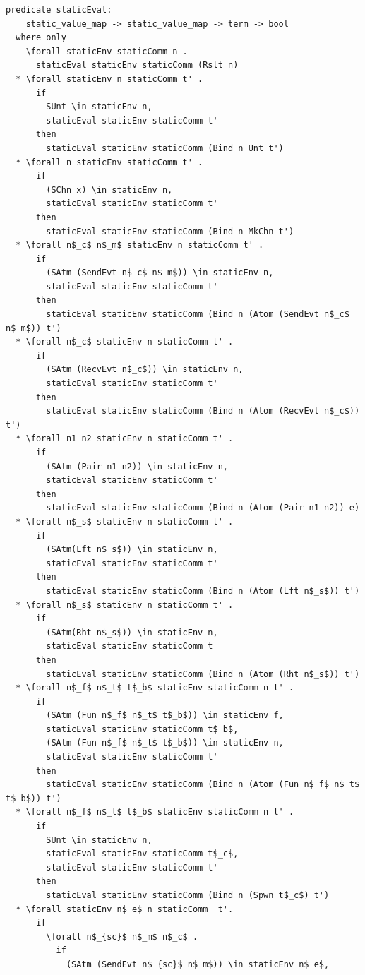 \documentclass[letterpaper, 11pt]{extarticle}
\begin{document}
\begin{lstlisting}[language=logic, mathescape]
  predicate staticEval:
    static_value_map -> static_value_map -> term -> bool
  where only
    \forall staticEnv staticComm n .
      staticEval staticEnv staticComm (Rslt n)
  * \forall staticEnv n staticComm t' .
      if 
        SUnt \in staticEnv n,
        staticEval staticEnv staticComm t'
      then
        staticEval staticEnv staticComm (Bind n Unt t')
  * \forall n staticEnv staticComm t' .
      if 
        (SChn x) \in staticEnv n,
        staticEval staticEnv staticComm t'
      then  
        staticEval staticEnv staticComm (Bind n MkChn t')
  * \forall n$_c$ n$_m$ staticEnv n staticComm t' .
      if
        (SAtm (SendEvt n$_c$ n$_m$)) \in staticEnv n,
        staticEval staticEnv staticComm t' 
      then
        staticEval staticEnv staticComm (Bind n (Atom (SendEvt n$_c$ n$_m$)) t')
  * \forall n$_c$ staticEnv n staticComm t' . 
      if 
        (SAtm (RecvEvt n$_c$)) \in staticEnv n,
        staticEval staticEnv staticComm t'
      then
        staticEval staticEnv staticComm (Bind n (Atom (RecvEvt n$_c$)) t')
  * \forall n1 n2 staticEnv n staticComm t' .
      if
        (SAtm (Pair n1 n2)) \in staticEnv n,
        staticEval staticEnv staticComm t'
      then
        staticEval staticEnv staticComm (Bind n (Atom (Pair n1 n2)) e)
  * \forall n$_s$ staticEnv n staticComm t' .
      if
        (SAtm(Lft n$_s$)) \in staticEnv n,
        staticEval staticEnv staticComm t' 
      then
        staticEval staticEnv staticComm (Bind n (Atom (Lft n$_s$)) t')
  * \forall n$_s$ staticEnv n staticComm t' .
      if
        (SAtm(Rht n$_s$)) \in staticEnv n, 
        staticEval staticEnv staticComm t
      then
        staticEval staticEnv staticComm (Bind n (Atom (Rht n$_s$)) t')
  * \forall n$_f$ n$_t$ t$_b$ staticEnv staticComm n t' .
      if
        (SAtm (Fun n$_f$ n$_t$ t$_b$)) \in staticEnv f, 
        staticEval staticEnv staticComm t$_b$, 
        (SAtm (Fun n$_f$ n$_t$ t$_b$)) \in staticEnv n, 
        staticEval staticEnv staticComm t'
      then
        staticEval staticEnv staticComm (Bind n (Atom (Fun n$_f$ n$_t$ t$_b$)) t')
  * \forall n$_f$ n$_t$ t$_b$ staticEnv staticComm n t' .
      if
        SUnt \in staticEnv n, 
        staticEval staticEnv staticComm t$_c$, 
        staticEval staticEnv staticComm t'
      then
        staticEval staticEnv staticComm (Bind n (Spwn t$_c$) t')
  * \forall staticEnv n$_e$ n staticComm  t'.
      if
        \forall n$_{sc}$ n$_m$ n$_c$ . 
          if
            (SAtm (SendEvt n$_{sc}$ n$_m$)) \in staticEnv n$_e$, 

\end{lstlisting}
\end{document}
